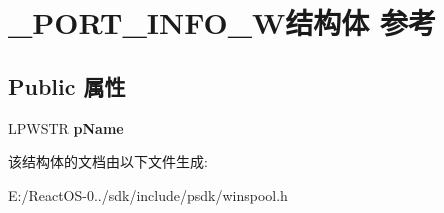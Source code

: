 \hypertarget{struct___p_o_r_t___i_n_f_o__1_w}{}\section{\+\_\+\+P\+O\+R\+T\+\_\+\+I\+N\+F\+O\+\_\+W结构体 参考}
\label{struct___p_o_r_t___i_n_f_o__1_w}
\subsection*{Public 属性}
\begin{DoxyCompactItemize}
\item 
\mbox{\label{struct___p_o_r_t___i_n_f_o__1_w_a056b8f68f14313ffdfe7eb3e5e28de7c}} 
L\+P\+W\+S\+TR {\bfseries p\+Name}
\end{DoxyCompactItemize}


该结构体的文档由以下文件生成\+:\begin{DoxyCompactItemize}
\item 
E\+:/\+React\+O\+S-\/0../sdk/include/psdk/winspool.\+h\end{DoxyCompactItemize}
